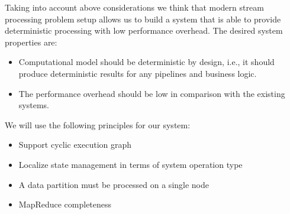 Taking into account above considerations we think that modern stream processing problem setup allows us to build a system that is able to provide deterministic processing with low performance overhead. The desired system properties are:
\begin{itemize}
  \item Computational model should be deterministic by design, i.e., it should produce deterministic results for any pipelines and business logic.
  \item The performance overhead should be low in comparison with the existing systems.
\end{itemize}
We will use the following principles for our system:
\begin{itemize}
  \item Support cyclic execution graph
  \item Localize state management in terms of system operation type
  \item A data partition must be processed on a single node
  \item MapReduce completeness
\end{itemize}
